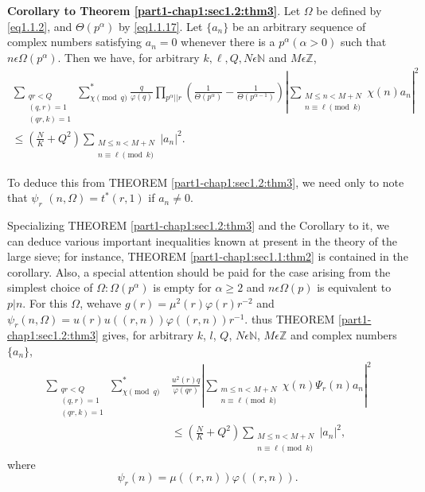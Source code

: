 \smallskip
\noindent 
\textbf{Corollary to Theorem \ref{part1-chap1:sec1.2:thm3}}. 
Let $\Omega$ be defined by \eqref{eq1.1.2}, and $\Theta(p^{\alpha})$ by
\eqref{eq1.1.17}. Let $\{a_n\}$ be an arbitrary sequence of
complex numbers 
satisfying $a_n=0$ whenever there is a $p^\alpha(\alpha>0)$ such that
$n\epsilon  \Omega(p^\alpha)$. Then we have, for arbitrary $k,\ell,
Q, N \epsilon \mathbb{N}$ and $M \epsilon \mathbb{Z}$,
\begin{gather*}
  \sum_{\substack{qr<Q\\ (q,r)=1\\ (qr,k)=1}}
  \sum^*_{\chi \pmod{q}}\frac{q}{\varphi(q)}\prod_{p^\alpha
    ||r}\left(\frac{1}{\Theta(p^\alpha)}-\frac{1}{\Theta(p^{\alpha
      -1})}\right)|\sum_{\substack{M\leq n<M+N\\ n\equiv \ell \pmod{k}}} \chi
  (n)a_n|^2 \\
  \leq \left(\frac{N}{K}+Q^2\right) \sum_{\substack{M\leq n<
      M+N\\ n\equiv \ell \pmod{k}}} |a_n|^2. 
\end{gather*}

To deduce this from THEOREM \ref{part1-chap1:sec1.2:thm3}, we need
only to note that 
$\psi_r$ $(n, \Omega)=t^*(r,1)$ if $a_n\neq 0$. 

Specializing THEOREM \ref{part1-chap1:sec1.2:thm3} and the Corollary
to it, we can deduce 
various important inequalities known at present in the theory of the
large sieve; for instance, THEOREM \ref{part1-chap1:sec1.1:thm2} is contained in the
corollary. Also, a special attention should be paid for the case
arising from the simplest choice of $\Omega:\Omega(p^\alpha)$ is empty
for $\alpha \geq 2$ and $n \epsilon  \Omega(p)$ is equivalent to
$p|n$. For this $\Omega$, we\pageoriginale have
$g(r)=\mu^2(r)\varphi(r)r^{-2}$ and
$\psi_r(n,\Omega)=u(r)u((r,n))\varphi((r,n))r^{-1}$. 
thus THEOREM \ref{part1-chap1:sec1.2:thm3} gives,  for arbitrary $k$,
$l$, $Q$, $N \epsilon \mathbb{N}$, $M \epsilon  \mathbb{Z}$ and
complex numbers $\{a_n\}$,  
\begin{equation*}
  \begin{aligned}
    \sum_{\substack
      {qr<Q\\ (q,r)=1\\ (qr,k)=1}}\sum^*_{\chi
      \pmod{q}}&\frac{u^2(r)q}{\varphi(qr)}|\sum_{\substack{m\leq
        n< M+N\\n\equiv \ell \pmod{k}}}\chi (n)\Psi_r(n)a_n|^2\\
    &\leq \left(\frac{N}{K}+Q^2\right)\sum_{\substack{M\leq n<M+N\\ n\equiv \ell
        \pmod{k}}}|a_n|^2,
  \end{aligned}
  \tag{1.2.10} \label{eq1.2.10}
\end{equation*}
where
\begin{equation*}
\psi_r(n)=\mu((r,n))\varphi((r,n)).\tag{1.2.11}\label{eq1.2.11}
\end{equation*}

